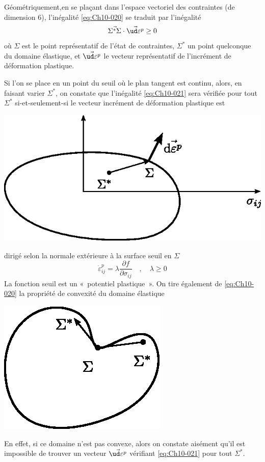 Géométriquement,en se plaçant dans l'espace vectoriel des contraintes (de dimension 6), l'inégalité \eqref{eq:Ch10-020} se traduit par l'inégalité 
\begin{equation}
    \vec{\Sigma^{\ast} \Sigma} \cdot \vec{\ud \varepsilon^p} \geq 0
    \label{eq:Ch10-021}
\end{equation}
où $\Sigma$ est le point représentatif de l'état de contraintes, $\Sigma^{\ast}$ un point quelconque du domaine élastique, et $\vec{\ud \varepsilon^p}$ le vecteur représentatif de l'incrément de déformation plastique. 

Si l'on se place en un point du seuil où le plan tangent est continu, alors, en faisant varier $\Sigma^{\ast}$, on constate que l'inégalité \eqref{eq:Ch10-021} sera vérifiée pour tout $\Sigma^{\ast}$ si-et-seulement-si le vecteur incrément de déformation plastique est 
\begin{center}
    \includegraphics{../images/T1_Ch10-09}
\end{center}
dirigé selon la normale extérieure à la surface seuil en $\Sigma$ 
\begin{equation}
    \dot{\varepsilon}_{ij}^p = \lambda \frac{\partial f}{\partial \sigma_{ij}} \quad,\quad \lambda \geq 0
    \label{eq:Ch10-022}
\end{equation}
La fonction seuil est un «~potentiel plastique~».
On tire également de \eqref{eq:Ch10-020} la propriété de convexité du domaine élastique 
\begin{multicols}{2}
    \begin{center}
        \includegraphics{../images/T1_Ch10-10}
    \end{center}
    \columnbreak
    En effet, si ce domaine n'est pas convexe, alors on constate aisément qu'il est impossible de trouver un vecteur $\vec{\ud \varepsilon^p}$ vérifiant \eqref{eq:Ch10-021} pour tout $\Sigma^{\ast}$.
\end{multicols}
